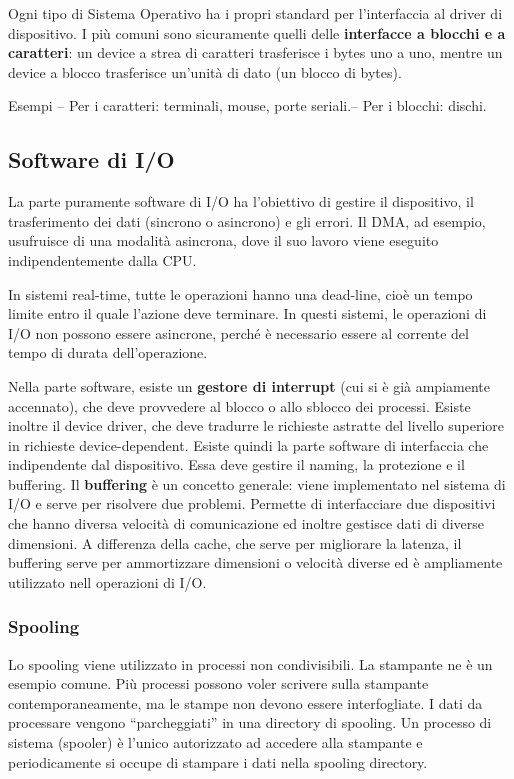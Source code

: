 \documentclass[a4]{article}
\begin{document}
Ogni tipo di Sistema Operativo ha i propri standard per l'interfaccia al driver di dispositivo. I più comuni sono sicuramente quelli delle \textbf{interfacce a blocchi e a caratteri}: un device a strea di caratteri trasferisce i bytes uno a uno, mentre un device a blocco trasferisce un'unità di dato (un blocco di bytes).

Esempi \newline -- Per i caratteri: terminali, mouse, porte seriali.\newline -- Per i blocchi: dischi.

\subsection{Software di I/O}
La parte puramente software di I/O ha l'obiettivo di gestire il dispositivo, il trasferimento dei dati (sincrono o asincrono) e gli errori. Il DMA, ad esempio, usufruisce di una modalità asincrona, dove il suo lavoro viene eseguito indipendentemente dalla CPU.

In sistemi real-time, tutte le operazioni hanno una dead-line, cioè un tempo limite entro il quale l'azione deve terminare. In questi sistemi, le operazioni di I/O non possono essere asincrone, perché è necessario essere al corrente del tempo di durata dell'operazione.

Nella parte software, esiste un \textbf{gestore di interrupt} (cui si è già ampiamente accennato), che deve provvedere al blocco o allo sblocco dei processi. Esiste inoltre il device driver, che deve tradurre le richieste astratte del livello superiore in richieste device-dependent. Esiste quindi la parte software di interfaccia che indipendente dal dispositivo. Essa deve gestire il naming, la protezione e il buffering. Il \textbf{buffering} è un concetto generale: viene implementato nel sistema di I/O e serve per risolvere due problemi. Permette di interfacciare due dispositivi che hanno diversa velocità di comunicazione ed inoltre gestisce dati di diverse dimensioni. A differenza della cache, che serve per migliorare la latenza, il buffering serve per ammortizzare dimensioni o velocità diverse ed è ampliamente utilizzato nell operazioni di I/O.

\subsubsection{Spooling}
Lo spooling viene utilizzato in processi non condivisibili. La stampante ne è un esempio comune. Più processi possono voler scrivere sulla stampante contemporaneamente, ma le stampe non devono essere interfogliate. I dati da processare vengono ``parcheggiati'' in una directory di spooling. Un processo di sistema (spooler) è l'unico autorizzato ad accedere alla stampante e periodicamente si occupe di stampare i dati nella spooling directory.
\end{document}
